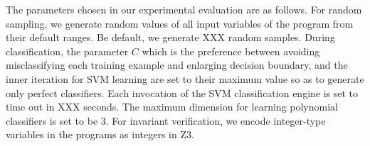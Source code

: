 The parameters chosen in our experimental evaluation are as follows.
For random sampling, we generate random values of all input variables of the program from their default ranges. Be default, we generate XXX random samples. 
During classification, the parameter $C$ which is the preference between avoiding misclassifying each training example and enlarging decision boundary,
and the inner iteration for SVM learning are set to their maximum value so as to generate only perfect classifiers. Each invocation of the SVM classification engine is set to time out in XXX seconds. The maximum dimension for learning polynomial classifiers is set to be 3. For invariant verification, we encode integer-type variables in the programs as integers in Z3. 


%
%

